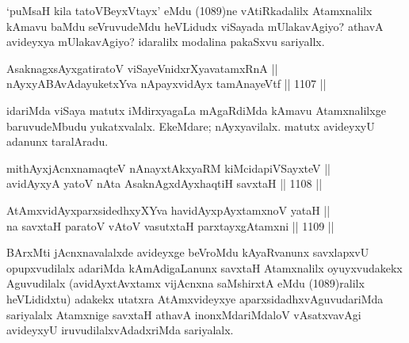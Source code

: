 \begin{artha}
`puMsaH kila tatoV\s BeyxVtayx' eMdu (1089)ne vAtiRkadalilx Atamxnalilx kAmavu baMdu seVruvudeMdu heVLidudx viSayada mUlakavAgiyo? athavA avideyxya mUlakavAgiyo? idaralilx modalina pakaSxvu sariyallx.
\end{artha}

\begin{shl}
AsaknagxsAyx\s \s gatiratoV viSayeVnidxrXyavatamxRnA || \\
nAyxyABAvAdayuketxYva nApayxvidAyx tamAnayeVtf \hfill || 1107 ||  
\end{shl}

\begin{artha}
idariMda viSaya matutx iMdirxyagaLa mAgaRdiMda kAmavu Atamxnalilxge baruvudeMbudu yukatxvalalx. EkeMdare; nAyxyavilalx. matutx avideyxyU adanunx taralAradu.
\end{artha}


\begin{shl}
mithAyxjAcnxnamaqteV nAnayxtAkxyaRM kiMcidapiVSayxteV ||  \\
avidAyxyA yatoV nAta AsaknAgxdAyxhaqtiH savxtaH \hfill || 1108 ||  
\end{shl}
				
\begin{shl}
AtAmxvidAyxparxsidedhxyXYva havidAyx\s pAyxtamxnoV yataH || \\
na savxtaH paratoV vA\s toV vasutxtaH parxtayxgAtamxni \hfill || 1109 ||  
\end{shl}

\begin{artha}
BArxMti jAcnxnavalalxde avideyxge beVroMdu kAyaRvanunx savxlapxvU opupxvudilalx adariMda kAmAdigaLanunx savxtaH Atamxnalilx oyuyxvudakekx Aguvudilalx (avidAyxtAvxtamx vijAcnxna saMshirxtA eMdu (1089)ralilx heVLididxtu) adakekx utatxra AtAmxvideyxye aparxsidadhxvAguvudariMda sariyalalx Atamxnige savxtaH athavA inonxMdariMdaloV vAsatxvavAgi avideyxyU iruvudilalxvAdadxriMda sariyalalx.
\end{artha}

